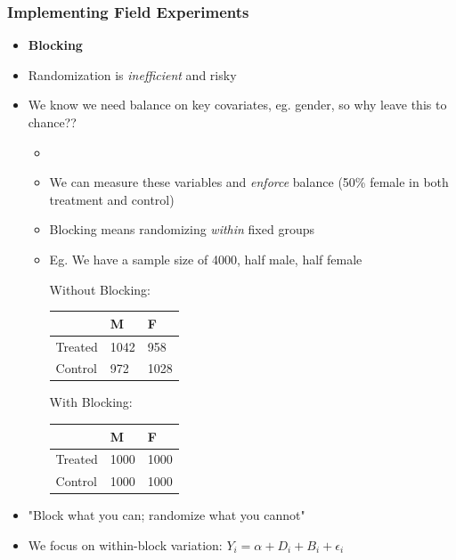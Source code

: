 \documentclass[xcolor=x11names,compress]{beamer}\usepackage[]{graphicx}\usepackage[]{color}
\renewcommand{\(}{\begin{columns}}
\renewcommand{\)}{\end{columns}}
\newcommand{\<}[1]{\begin{column}{#1}}
\renewcommand{\>}{\end{column}}
\begin{document}
\begin{frame}
\frametitle{Implementing Field Experiments}
\begin{itemize}
\item \textbf{Blocking}
\pause
\item Randomization is \textit{inefficient} and risky
\pause
\item We know we need balance on key covariates, eg. gender, so why leave this to chance??
\begin{itemize}
\item 
\pause
\item We can measure these variables and \textit{enforce} balance (50\% female in both treatment and control)
\pause
\item Blocking means randomizing \textit{within} fixed groups
\pause
\item Eg. We have a sample size of 4000, half male, half female
\pause
\begin{multicols}{2}
Without Blocking:
\begin{table}[]
\begin{tabular}{|l|l|l|}
\hline
        & M    & F    \\ \hline
Treated & 1042 & 958  \\ \hline
Control & 972  & 1028 \\ \hline
\end{tabular}
\end{table}
\columnbreak
With Blocking:
\begin{table}[]
\begin{tabular}{|l|l|l|}
\hline
        & M    & F    \\ \hline
Treated & 1000 & 1000  \\ \hline
Control & 1000 & 1000 \\ \hline
\end{tabular}
\end{table}
\end{multicols}
\end{itemize}
\pause
\item "Block what you can; randomize what you cannot"
\pause
\item We focus on within-block variation: $Y_i = \alpha + D_i + B_i + \epsilon_i$
\end{itemize}
\end{frame}
\end{document}
